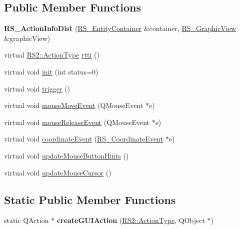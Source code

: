 \subsection*{Public Member Functions}
\begin{DoxyCompactItemize}
\item 
\hypertarget{classRS__ActionInfoDist_a8fb6bfe98264a3e5ef4ca49a8c9a479b}{{\bfseries R\-S\-\_\-\-Action\-Info\-Dist} (\hyperlink{classRS__EntityContainer}{R\-S\-\_\-\-Entity\-Container} \&container, \hyperlink{classRS__GraphicView}{R\-S\-\_\-\-Graphic\-View} \&graphic\-View)}\label{classRS__ActionInfoDist_a8fb6bfe98264a3e5ef4ca49a8c9a479b}

\item 
virtual \hyperlink{classRS2_afe3523e0bc41fd637b892321cfc4b9d7}{R\-S2\-::\-Action\-Type} \hyperlink{classRS__ActionInfoDist_a31c108acf5c20bdaae82c9c9b0b48d11}{rtti} ()
\item 
virtual void \hyperlink{classRS__ActionInfoDist_a5c8b40860e81f029a08b8fe88d703a2f}{init} (int status=0)
\item 
virtual void \hyperlink{classRS__ActionInfoDist_a18b9794da319137a344a1b683949b279}{trigger} ()
\item 
virtual void \hyperlink{classRS__ActionInfoDist_ad52368d42166238e66bb078b109a368f}{mouse\-Move\-Event} (Q\-Mouse\-Event $\ast$e)
\item 
virtual void \hyperlink{classRS__ActionInfoDist_aadbc5ea8e90a3a744d19ad516933202b}{mouse\-Release\-Event} (Q\-Mouse\-Event $\ast$e)
\item 
virtual void \hyperlink{classRS__ActionInfoDist_aece5788a908e7d94e3db87675a3eef31}{coordinate\-Event} (\hyperlink{classRS__CoordinateEvent}{R\-S\-\_\-\-Coordinate\-Event} $\ast$e)
\item 
virtual void \hyperlink{classRS__ActionInfoDist_af6f0105fe62569dfcfe6c7b343b7194b}{update\-Mouse\-Button\-Hints} ()
\item 
virtual void \hyperlink{classRS__ActionInfoDist_a3a249ee8f1d3548e386ea35be7e0ff38}{update\-Mouse\-Cursor} ()
\end{DoxyCompactItemize}
\subsection*{Static Public Member Functions}
\begin{DoxyCompactItemize}
\item 
\hypertarget{classRS__ActionInfoDist_aaeb7a110952ceb8c2ef4b71654cd5387}{static Q\-Action $\ast$ {\bfseries create\-G\-U\-I\-Action} (\hyperlink{classRS2_afe3523e0bc41fd637b892321cfc4b9d7}{R\-S2\-::\-Action\-Type}, Q\-Object $\ast$)}\label{classRS__ActionInfoDist_aaeb7a110952ceb8c2ef4b71654cd5387}

\end{DoxyCompactItemize}
